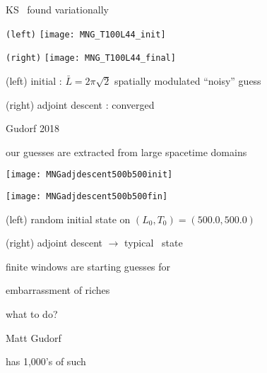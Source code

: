 \begin{frame}{KS \twot\ found variationally}
\begin{minipage}[height=.72\textheight]{.40\textwidth}
\centering \small{\texttt{(left)}}
\texttt{[image: MNG\_T100L44\_init]}
\end{minipage}
\begin{minipage}[height=.72\textheight]{.40\textwidth}
\centering \small{\texttt{(right)}}
\texttt{[image: MNG\_T100L44\_final]}
\end{minipage}

\vfill
(left) initial : $\bar{L}=2\pi\sqrt{2}$ spatially modulated ``noisy'' guess

(right) adjoint descent : converged \twot\

\vfill\hfill        Gudorf 2018
\end{frame}

\begin{frame}{our guesses are extracted from large spacetime domains}
\begin{minipage}[height=.45\textwidth]{.45\textwidth}
\centering %
\texttt{[image: MNGadjdescent500b500init]}
\end{minipage}
\begin{minipage}[height=.45\textwidth]{.45\textwidth}
\centering %
\texttt{[image: MNGadjdescent500b500fin]}
\end{minipage}

(left) random initial state on
$(L_0,T_0)=(500.0,500.0)$

(right) adjoint descent $\to$ typical \KS\ state

\vfill\hfill
finite windows are starting guesses for \twots
\end{frame}

\begin{frame}{embarrassment of riches}
\begin{center}
{\huge what to do?}
\end{center}

\vfill

{\Large Matt Gudorf}

\medskip

\hfill has 1,000's of such \twots
\end{frame}



